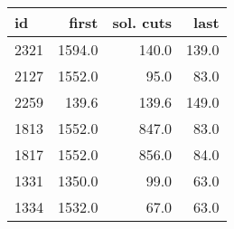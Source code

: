 \begin{tabular}{lrrr}
\toprule
   id &  first &  sol. cuts &  last \\
\midrule
 2321 & 1594.0 &      140.0 & 139.0 \\
 2127 & 1552.0 &       95.0 &  83.0 \\
 2259 &  139.6 &      139.6 & 149.0 \\
 1813 & 1552.0 &      847.0 &  83.0 \\
 1817 & 1552.0 &      856.0 &  84.0 \\
 1331 & 1350.0 &       99.0 &  63.0 \\
 1334 & 1532.0 &       67.0 &  63.0 \\
\bottomrule
\end{tabular}
